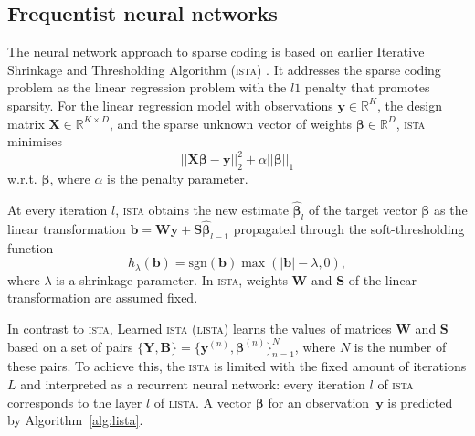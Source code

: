 \documentclass{article}
\begin{document}
\subsection{Frequentist neural networks}  
\label{subsec:nn_sc}
  The neural network approach to sparse coding is based on earlier Iterative Shrinkage and Thresholding Algorithm (\textsc{ista}) \cite{daubechies2004iterative}. It addresses the sparse coding problem as the linear regression problem with the $l1$ penalty that promotes sparsity. For the linear regression model with observations $\mathbf{y} \in \mathbb{R}^K$, the design matrix $\mathbf{X} \in \mathbb{R}^{K \times D}$, and the sparse unknown vector of weights $\boldsymbol\beta \in \mathbb{R}^D$, \textsc{ista} minimises
  \begin{equation}
  \label{eq:regression_problem}
  ||\mathbf{X}\boldsymbol\beta - \mathbf{y}||_2^2 + \alpha ||\boldsymbol\beta||_1
  \end{equation}
w.r.t.  $\boldsymbol\beta$,  where $\alpha$ is the penalty parameter.
  
  At every iteration $l$, \textsc{ista} obtains the new estimate $\widehat{\boldsymbol\beta}_l$ of the target vector $\boldsymbol\beta$ as the linear transformation $\mathbf{b} = \mathbf{W}\mathbf{y} + \mathbf{S}\widehat{\boldsymbol\beta}_{l-1}$ propagated through the soft-thresholding function %
  \begin{equation}
  h_\lambda(\mathbf{b}) = \text{sgn}(\mathbf{b}) \max(|\mathbf{b}| - \lambda, 0),
  \end{equation}
  where $\lambda$ is a shrinkage parameter.
  In \textsc{ista}, weights $\mathbf{W}$ and $\mathbf{S}$ of the linear transformation are assumed fixed.
  
  In contrast to \textsc{ista}, Learned \textsc{ista} (\textsc{lista}) \cite{gregor2010learning} learns the values of matrices $\mathbf{W}$ and $\mathbf{S}$ based on a set of pairs $\{\mathbf{Y}, \mathbf{B}\}=\{\mathbf{y}^{(n)}, \boldsymbol\beta^{(n)}\}_{n=1}^N$, where $N$ is the number of these pairs. To achieve this, the \textsc{ista} is limited with the fixed amount of iterations $L$ and interpreted as a recurrent neural network: every iteration $l$ of \textsc{ista} corresponds to the layer $l$ of \textsc{lista}. A vector $\boldsymbol\beta$ for an observation~$\mathbf{y}$ is predicted by Algorithm~\ref{alg:lista}.
  
\end{document}
